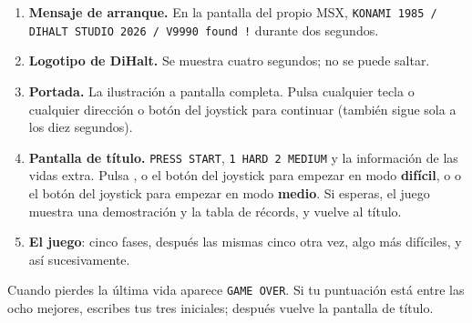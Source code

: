 \begin{enumerate}
\item \textbf{Mensaje de arranque.} En la pantalla del propio MSX, \texttt{KONAMI 1985 / DIHALT STUDIO 2026 / V9990 found !} durante dos segundos.
\item \textbf{Logotipo de DiHalt.} Se muestra cuatro segundos; no se puede saltar.
\item \textbf{Portada.} La ilustraci\'on a pantalla completa. Pulsa cualquier tecla o cualquier direcci\'on o bot\'on del joystick para continuar (tambi\'en sigue sola a los diez segundos).
\item \textbf{Pantalla de t\'itulo.} \texttt{PRESS START}, \texttt{1 HARD 2 MEDIUM} y la informaci\'on de las vidas extra. Pulsa ,  o el bot\'on  del joystick para empezar en modo \textbf{dif\'icil}, o  o el bot\'on  del joystick para empezar en modo \textbf{medio}. Si esperas, el juego muestra una demostraci\'on y la tabla de r\'ecords, y vuelve al t\'itulo.
\item \textbf{El juego}: cinco fases, despu\'es las mismas cinco otra vez, algo m\'as dif\'iciles, y as\'i sucesivamente.
\end{enumerate}

Cuando pierdes la \'ultima vida aparece \texttt{GAME OVER}. Si tu puntuaci\'on est\'a entre las ocho mejores, escribes tus tres iniciales; despu\'es vuelve la pantalla de t\'itulo.
